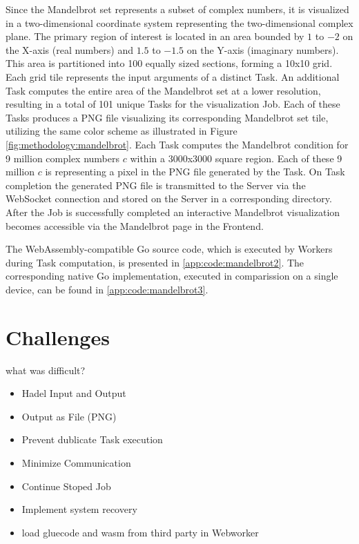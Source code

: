 Since the Mandelbrot set represents a subset of complex numbers, it is visualized in a two-dimensional coordinate system representing the two-dimensional complex plane. The primary region of interest is located in an area bounded by $1$ to $-2$ on the X-axis (real numbers) and $1.5$ to $-1.5$ on the Y-axis (imaginary numbers). This area is partitioned into 100 equally sized sections, forming a 10x10 grid. Each grid tile represents the input arguments of a distinct Task. An additional Task computes the entire area of the Mandelbrot set at a lower resolution, resulting in a total of 101 unique Tasks for the visualization Job. Each of these Tasks produces a \ac{PNG} file visualizing its corresponding Mandelbrot set tile, utilizing the same color scheme as illustrated in Figure \ref{fig:methodology:mandelbrot}. Each Task computes the Mandelbrot condition for 9 million complex numbers $c$ within a 3000x3000 square region. Each of these 9 million $c$ is representing a pixel in the \ac{PNG} file generated by the Task. On Task completion the generated \ac{PNG} file is transmitted to the Server via the WebSocket connection and stored on the Server in a corresponding directory. After the Job is successfully completed an interactive Mandelbrot visualization becomes accessible via the Mandelbrot page in the Frontend.

The WebAssembly-compatible Go source code, which is executed by Workers during Task computation, is presented in \ref{app:code:mandelbrot2}. The corresponding native Go implementation, executed in comparission on a single device, can be found in \ref{app:code:mandelbrot3}.

\section{Challenges}
\label{sec:implementation:challenges}
what was difficult?
\begin{itemize}
    \item Hadel Input and Output
    \item Output as File (PNG)
    \item Prevent dublicate Task execution
    \item Minimize Communication
    \item Continue Stoped Job
    \item Implement system recovery
    \item load gluecode and wasm from third party in Webworker
\end{itemize}